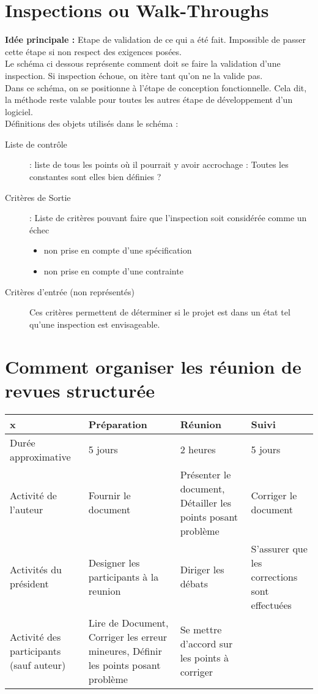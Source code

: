 \section{Inspections ou Walk-Throughs}

\textbf{Idée principale :} Etape de validation de ce qui a été fait. Impossible de passer cette étape si non respect des exigences posées.\\

Le schéma ci dessous représente comment doit se faire la validation d’une inspection. Si inspection échoue, on itère tant qu’on ne la valide pas.\\
Dans ce schéma, on se positionne à l’étape de conception fonctionnelle. Cela dit, la méthode reste valable pour toutes les autres étape de développement d’un logiciel.\\

Définitions des objets utilisés dans le schéma :
\begin{description}
\item[Liste de contrôle] : liste de tous les points où il pourrait y avoir accrochage : Toutes les constantes sont elles bien définies ?
\item [Critères de Sortie] : Liste de critères pouvant faire que l’inspection soit considérée comme un échec
	\begin{itemize}
	\item non prise en compte d'une spécification
	\item non prise  en compte d'une contrainte
	\end{itemize}
\item[Critères d’entrée (non représentés)] Ces critères permettent de déterminer si le projet est dans un état tel qu’une inspection est envisageable.
\end{description}


\section{Comment organiser les réunion de revues structurée}

\begin{tabular}{|p{2.5cm}|p{2.5cm}|p{2.5cm}|p{2.5cm}|}
\hline
 x & Préparation & Réunion & Suivi\\
\hline
Durée approximative & 5 jours & 2 heures & 5 jours\\
\hline
Activité de l’auteur & Fournir le document & Présenter le document, Détailler les points posant problème & Corriger le document\\
\hline 
Activités du président & Designer les participants à la reunion & Diriger les débats & S’assurer que les corrections sont effectuées\\
\hline 
Activité des participants (sauf auteur)	& Lire de Document, Corriger les erreur mineures, Définir les points posant problème & Se mettre d’accord sur les points à corriger &\\
\hline
\end{tabular}


